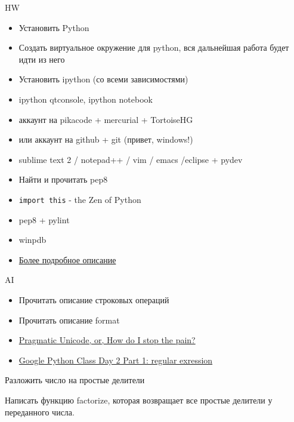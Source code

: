 \documentclass{article}
\begin{document}
\LARGE

\begin{center} HW \end{center}
\begin{itemize}
    \item Установить Python
    \item Создать виртуальное окружение для python, 
            вся дальнейшая работа будет идти из него
    \item Установить ipython (со всеми зависимостями)
    \item ipython qtconsole, ipython notebook
    \item аккаунт на pikacode + mercurial + TortoiseHG
    \item или аккаунт на github + git (привет, windows!)
    \item sublime text 2 / notepad++ / vim / emacs /eclipse + pydev
    \item Найти и прочитать pep8
    \item \lstinline!import this! - the Zen of Python
    \item pep8 + pylint
    \item winpdb
    \item \href{http://koder-ua.blogspot.com/2012/09/blog-post.html}{Более подробное описание}
\end{itemize}
\newpage

\begin{center} AI \end{center}
\begin{itemize}
  \item Прочитать описание строковых операций
  \item Прочитать описание format
  \item \href{http://www.youtube.com/watch?feature=player_embedded&v=sgHbC6udIqc}{Pragmatic Unicode, or, How do I stop the pain?}
  \item \href{http://www.youtube.com/watch?v=kWyoYtvJpe4}{Google Python Class Day 2 Part 1: regular exression}
\end{itemize}


\begin{center} Разложить число на простые делители \end{center}
Написать функцию factorize, которая возвращает все простые делители
у переданного числа.
\newpage
\end{document}
